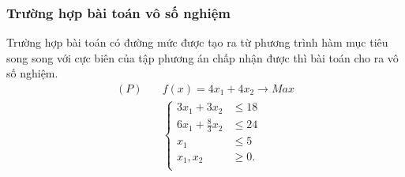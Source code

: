 \documentclass[12pt,a4paper]{report}
\begin{document}
\subsubsection*{Trường hợp bài toán vô số nghiệm}

Trường hợp bài toán có đường mức được tạo ra từ phương trình hàm mục tiêu song song với cực biên của tập phương án chấp nhận được thì bài toán cho ra vô số nghiệm.
\begin{equation} \label{thvosonghiem}
	\begin{split}
	(P) \quad & f(x) = 4x_1 + 4x_2 \longrightarrow Max \\
		& \left\{\begin{split}
        3x_1 + 3x_2 &\leq 18 \\
        6x_1 + \frac{8}{3} x_2 &\leq 24 \\
        x_1 & \leq 5 \\
		x_1, x_2 &\geq 0. \\
		\end{split}\right.    
	\end{split}
\end{equation}
\end{document}

